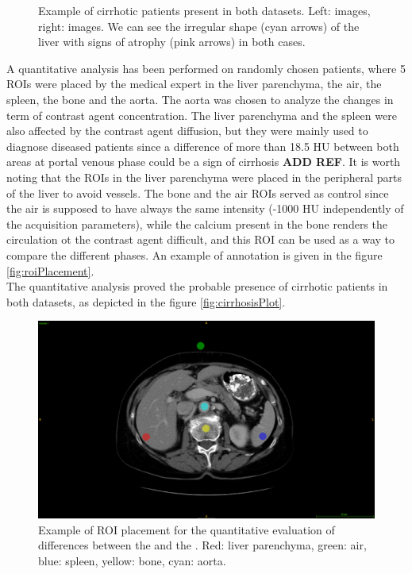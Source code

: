 {\begin{figure}[!ht]
\begin{mdframed}[backgroundcolor=blue!50,linecolor=blue!50]
\begin{minipage}{0.45\linewidth}
		\end{minipage}
	\end{mdframed}
	\caption{Example of cirrhotic patients present in both datasets.  Left: \textbf{} images, right: \textbf{} images. We can see the irregular shape (cyan arrows) of the liver with signs of atrophy (pink arrows) in both cases.}
	\label{fig:InterDb_diseasedLivers}
\end{figure}
A quantitative analysis has been performed on randomly chosen patients, where 5 ROIs were placed by the medical expert in the liver parenchyma, the air, the spleen, the bone and the aorta. The aorta was chosen to analyze the changes in term of contrast agent concentration. The liver parenchyma and the spleen were also affected by the contrast agent diffusion, but they were mainly used to diagnose diseased patients since a difference of more than 18.5 HU between both areas at portal venous phase could be a sign of cirrhosis \textbf{ADD REF}. It is worth noting that the ROIs in the liver parenchyma were placed in the peripheral parts of the liver to avoid vessels. The bone and the air ROIs served as control since the air is supposed to have always the same intensity (-1000 HU independently of the acquisition parameters), while the calcium present in the bone renders the circulation ot the contrast agent difficult, and this ROI can be used as a way to compare the different phases. An example of annotation is given in the figure \ref{fig:roiPlacement}. \\
The quantitative analysis proved the probable presence of cirrhotic patients in both datasets, as depicted in the figure \ref{fig:cirrhosisPlot}.
\begin{figure}[!ht]
	\begin{mdframed}[backgroundcolor=blue!50,linecolor=blue!50]
		\centering
		\includegraphics[width=0.6\linewidth]{images/juan_Roi_Example}
		\caption{Example of ROI placement for the quantitative evaluation of differences between the \textbf{} and the \textbf{}. Red: liver parenchyma, green: air, blue: spleen, yellow: bone, cyan: aorta.}

\end{mdframed}
\end{figure}}
